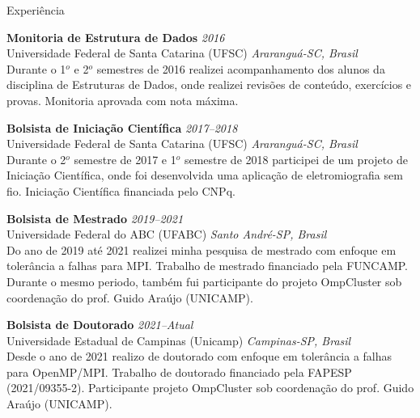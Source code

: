 \documentclass[a4paper]{resume}
\begin{document}

\begin{rSection}{Experiência}

{\bf Monitoria de Estrutura de Dados} \hfill{\em 2016} \\
{\sc Universidade Federal de Santa Catarina (UFSC)} \hfill {\em Araranguá-SC, Brasil} \\
Durante o 1$^o$ e 2$^o$ semestres de 2016 realizei acompanhamento dos alunos da disciplina 
de Estruturas de Dados, onde realizei revisões de conteúdo, exercícios e provas. Monitoria aprovada com nota máxima.

{\bf Bolsista de Iniciação Científica} \hfill{\em 2017--2018} \\
{\sc Universidade Federal de Santa Catarina (UFSC)} \hfill {\em Araranguá-SC, Brasil} \\
Durante o 2$^o$ semestre de 2017 e 1$^o$ semestre de 2018 participei de um projeto de Iniciação Científica, onde foi desenvolvida uma aplicação de eletromiografia sem fio. Iniciação Científica financiada pelo CNPq.

{\bf Bolsista de Mestrado} \hfill{\em 2019--2021} \\
{\sc Universidade Federal do ABC (UFABC)} \hfill {\em Santo André-SP, Brasil} \\
Do ano de 2019 até 2021 realizei minha pesquisa de mestrado com enfoque em tolerância a falhas para MPI. Trabalho de mestrado financiado pela FUNCAMP. Durante o mesmo periodo, também fui participante do projeto OmpCluster sob coordenação do prof. Guido Araújo (UNICAMP).

{\bf Bolsista de Doutorado} \hfill{\em 2021--Atual} \\
{\sc Universidade Estadual de Campinas (Unicamp)} \hfill {\em Campinas-SP, Brasil} \\
Desde o ano de 2021 realizo de doutorado com enfoque em tolerância a falhas para OpenMP/MPI. Trabalho de doutorado financiado pela FAPESP (2021/09355-2). Participante projeto OmpCluster sob coordenação do prof. Guido Araújo (UNICAMP).

\end{rSection}


\end{document}
